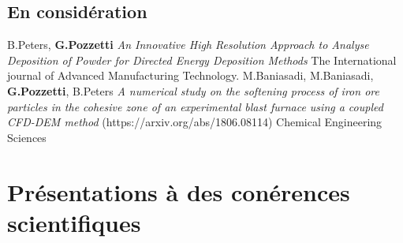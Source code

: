\documentclass[11pt,a4paper]{moderncv}
\begin{document}

\subsection{\textbf{En consid\'eration}}



 {B.Peters, \textbf{G.Pozzetti}
\textit{An Innovative High Resolution Approach to Analyse Deposition of Powder for Directed Energy Deposition Methods} The International journal of Advanced Manufacturing Technology.}
 {M.Baniasadi, M.Baniasadi, \textbf{G.Pozzetti}, B.Peters
\textit{A numerical study on the softening process of iron ore particles in the cohesive zone of an experimental blast furnace using a coupled CFD-DEM method} (https://arxiv.org/abs/1806.08114) Chemical Engineering Sciences}

\normalsize
\section{Pr\'esentations \`a des con\'erences scientifiques}
\end{document}
